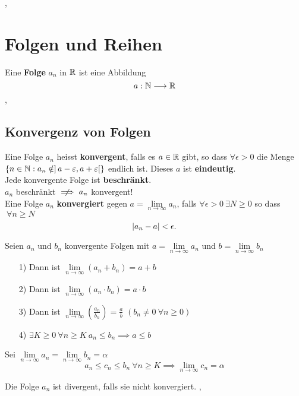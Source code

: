 \sep
\section{Folgen und Reihen}

\Def[2.1.1] Eine \textbf{Folge} $a_n$ in $\mathbb{R}$ ist eine Abbildung
\[
a: \mathbb{N}\longrightarrow \mathbb{R}
\] 
\sep
\subsection{Konvergenz von Folgen}

\Def[2.1.4] Eine Folge $a_n$ heisst \textbf{konvergent}, falls es $a \in \mathbb{R}$ gibt, so dass $\forall \epsilon > 0$ die Menge
$
\left\{n \in \mathbb{N}: a_{n} \notin\right] a-\varepsilon, a+\varepsilon[\}
$ endlich ist.
\Lemma[2.1.3] Dieses $a$ ist \textbf{eindeutig}. \\

\Lemma[2.1.5] Jede konvergente Folge ist \textbf{beschränkt}. \\
\Achtung $a_{n}$ beschränkt $\centernot\implies a_{n}$ konvergent! \\

\Lemma[2.1.6] Eine Folge $a_n$ \textbf{konvergiert} gegen ${a = \lim\limits_{n \rightarrow \infty} a_{n}}$, falls $ \forall \epsilon > 0 \ \exists N \geq 0$ so dass $\ \forall n\geq N$
\[
 \left\lvert a_n-a \right\rvert < \epsilon.
\]

\Satz[2.1.8] Seien $a_n$ und $b_n$ konvergente Folgen mit $a = \lim\limits_{n \rightarrow \infty} a_{n}$ und  $b = \lim\limits_{n \rightarrow \infty} b_{n}$
\begin{enumerate}
\item[1)] Dann ist $\lim\limits_{n \rightarrow \infty} (a_{n} + b_{n}) = a + b$
\item[2)] Dann ist $\lim\limits_{n \rightarrow \infty} (a_{n} \cdot b_{n}) = a \cdot b$
\item[3)] Dann ist $\lim\limits_{n \rightarrow \infty} (\frac{a_{n}}{b_{n}}) = \frac{a}{b}$ $(b_{n} \neq 0 \ \forall n \geq 0)$
\item[4)] $\exists K \geq 0 \ \forall n \geq K \ a_{n} \leq b_{n} \implies a \leq b$

\end{enumerate}

 Sei $\lim\limits_{n \rightarrow \infty} a_{n} = \lim\limits_{n \rightarrow \infty} b_{n} = \alpha$ 
\[
a_{n} \leq c_{n} \leq b_{n} \ \forall n \geq K \implies \lim\limits_{n \rightarrow \infty} c_{n} = \alpha
\]

Die Folge $a_{n}$ ist divergent, falls sie nicht konvergiert.
\sep


